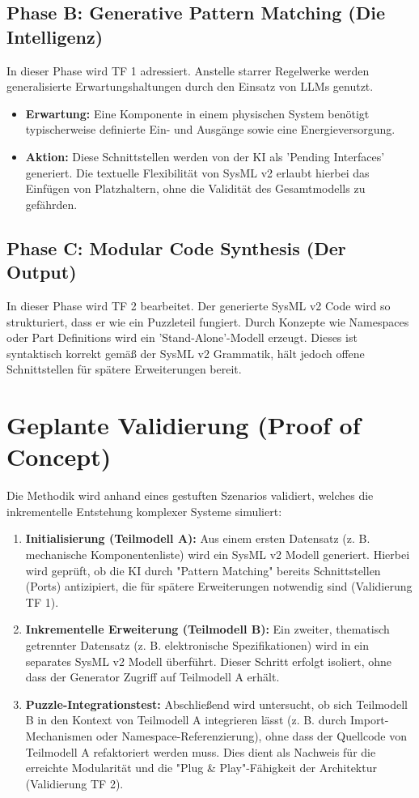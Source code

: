 \documentclass[12pt, a4paper]{article}
\begin{document}
\subsection*{Phase B: Generative Pattern Matching (Die Intelligenz)}
In dieser Phase wird TF 1 adressiert. Anstelle starrer Regelwerke werden generalisierte Erwartungshaltungen durch den Einsatz von LLMs genutzt.
\begin{itemize}
    \item \textbf{Erwartung:} Eine Komponente in einem physischen System benötigt typischerweise definierte Ein- und Ausgänge sowie eine Energieversorgung.
    \item \textbf{Aktion:} Diese Schnittstellen werden von der KI als 'Pending Interfaces' generiert. Die textuelle Flexibilität von SysML v2 erlaubt hierbei das Einfügen von Platzhaltern, ohne die Validität des Gesamtmodells zu gefährden.
\end{itemize}

\subsection*{Phase C: Modular Code Synthesis (Der Output)}
In dieser Phase wird TF 2 bearbeitet. Der generierte SysML v2 Code wird so strukturiert, dass er wie ein Puzzleteil fungiert. Durch Konzepte wie Namespaces oder Part Definitions wird ein 'Stand-Alone'-Modell erzeugt. Dieses ist syntaktisch korrekt gemäß der SysML v2 Grammatik, hält jedoch offene Schnittstellen für spätere Erweiterungen bereit.

\section{Geplante Validierung (Proof of Concept)}

Die Methodik wird anhand eines gestuften Szenarios validiert, welches die inkrementelle Entstehung komplexer Systeme simuliert:
\begin{enumerate}
    \item \textbf{Initialisierung (Teilmodell A):} Aus einem ersten Datensatz (z. B. mechanische Komponentenliste) wird ein SysML v2 Modell generiert. Hierbei wird geprüft, ob die KI durch "Pattern Matching" bereits Schnittstellen (Ports) antizipiert, die für spätere Erweiterungen notwendig sind (Validierung TF 1).
    \item \textbf{Inkrementelle Erweiterung (Teilmodell B):} Ein zweiter, thematisch getrennter Datensatz (z. B. elektronische Spezifikationen) wird in ein separates SysML v2 Modell überführt. Dieser Schritt erfolgt isoliert, ohne dass der Generator Zugriff auf Teilmodell A erhält.
    \item \textbf{Puzzle-Integrationstest:} Abschließend wird untersucht, ob sich Teilmodell B in den Kontext von Teilmodell A integrieren lässt (z. B. durch Import-Mechanismen oder Namespace-Referenzierung), ohne dass der Quellcode von Teilmodell A refaktoriert werden muss. Dies dient als Nachweis für die erreichte Modularität und die "Plug \& Play"-Fähigkeit der Architektur (Validierung TF 2).
\end{enumerate}
\end{document}
